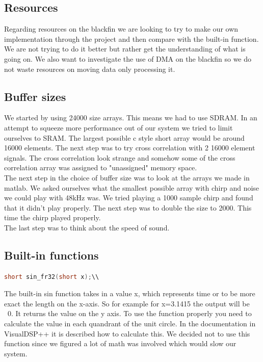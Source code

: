\subsection{Resources}
Regarding resources on the blackfin we are looking to try to make our own implementation through the project and then compare with the built-in function. We are not trying to do it better but rather get the understanding of what is going on.
We also want to investigate the use of DMA on the blackfin so we do not waste resources on moving data only processing it.

\subsection{Buffer sizes}
We started by using 24000 size arrays. This means we had to use SDRAM. In an attempt to squeeze more performance out of our system we tried to limit ourselves to SRAM. The largest possible c style short array would be around 16000 elements. The next step was to try cross correlation with 2 16000 element signals. The cross correlation look strange and somehow some of the cross correlation array was assigned to "unassigned" memory space.\\
The next step in the choice of buffer size was to look at the arrays we made in matlab. We asked ourselves what the smallest possible array with chirp and noise we could play with 48kHz was. We tried playing a 1000 sample chirp and found that it didn't play properly. The next step was to double the size to 2000. This time the chirp played properly.\\
The last step was to think about the speed of sound. 

\subsection{Built-in functions}
\begin{lstlisting}[language=C]
short sin_fr32(short x);\\
\end{lstlisting}
The built-in sin function takes in a value x, which represents time or to be more exact the length on the x-axis. So for example for x=3.1415 the output will be ~0. It returns the value on the y axis. To use the function properly you need to calculate the value in each quandrant of the unit circle. In the documentation in VisualDSP++ it is described how to calculate this. We decided not to use this function since we figured a lot of math was involved which would slow our system.

